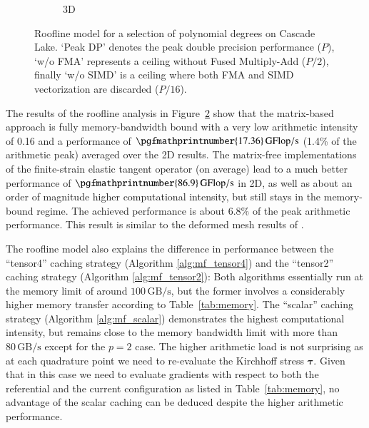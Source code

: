 \documentclass[AMA,STIX1COL]{WileyNJD-v2}
\newcommand*{\gz}[1]{\boldsymbol{#1}}
\begin{document}
\begin{figure}[!ht]
\begin{subfigure}[b]{0.49\textwidth}
    \caption{3D}
    \label{fig:roofline_3d}
  \end{subfigure}
  \caption{Roofline model for a selection of polynomial degrees on Cascade Lake. `Peak DP' denotes the peak double precision performance ($P$),
  `w/o FMA' represents a ceiling without Fused Multiply-Add ($P/2$), finally `w/o SIMD' is a ceiling where both FMA
    and SIMD vectorization are discarded ($P/16$).}%
  \label{fig:roofline}
\end{figure}

The results of the roofline analysis in Figure~\ref{fig:roofline} show that the matrix-based approach is fully memory-bandwidth bound with a
very low arithmetic intensity of 0.16 and a performance of $\pgfmathprintnumber{17.36}\,\rm{GFlop/s}$ (1.4\% of the arithmetic peak) averaged over the 2D results.
The matrix-free implementations of the finite-strain elastic tangent operator (on average) lead to a much better performance of
$\pgfmathprintnumber{86.9}\,\rm{GFlop/s}$ in 2D, as well as about an order of magnitude higher computational intensity, but still stays in the memory-bound regime.
The achieved performance is about 6.8\% of the peak arithmetic performance. This result is similar to the deformed mesh results of \cite[Figure 18]{kronbichler2017fast}.

The roofline model also explains the difference in performance between the ``tensor4'' caching strategy (Algorithm \ref{alg:mf_tensor4}) and the ``tensor2'' caching strategy (Algorithm \ref{alg:mf_tensor2}):
Both algorithms essentially run at the memory limit of around $100\, \text{GB/s}$, but the former involves a considerably higher memory transfer according to Table~\ref{tab:memory}.
The ``scalar'' caching strategy (Algorithm \ref{alg:mf_scalar}) demonstrates the highest computational intensity, but remains close to the memory bandwidth limit
with more than $80\, \text{GB/s}$ except for the $p=2$ case.
The higher arithmetic load is not surprising as at each quadrature point we need to re-evaluate the Kirchhoff stress $\gz \tau$.
Given that in this case we need to evaluate gradients with respect to both the referential and the current configuration as listed in Table~\ref{tab:memory},
no advantage of the scalar caching can be deduced despite the higher arithmetic performance.
\end{document}
